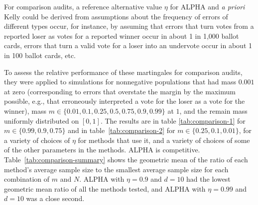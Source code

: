 \documentclass[12pt,runningheads]{llncs}
\begin{document}
{For comparison audits, a reference alternative value $\eta$ for ALPHA and \emph{a priori} Kelly could be derived from assumptions about the 
frequency of errors of different types occur, for instance, by assuming that errors that turn votes from a reported loser 
as votes for a reported winner occur in about 1 in 1,000 ballot cards, errors that turn a valid vote for a loser into an 
undervote occur in about 1 in 100 ballot cards, etc.

To assess the relative performance of these martingales for comparison audits, they were applied to
simulations for nonnegative populations that had mass $0.001$ at zero (corresponding to errors that overstate the
margin by the maximum possible, e.g., that erroneously interpreted a vote for the loser as a vote for the winner), 
mass $m \in \{0.01, 0.1, 0.25, 0.5, 0.75, 0.9, 0.99\}$
at $1$, and the remain mass uniformly distributed on $[0, 1]$.
The results are in table \ref{tab:comparison-1} for $m \in \{0.99, 0.9, 0.75\}$ and 
in table~\ref{tab:comparison-2} for $m \in \{0.25, 0.1, 0.01\}$,
for a variety of choices of $\eta$ for methods that use it, and a variety of choices of some of the other parameters
in the methods.
ALPHA is competitive.
Table~\ref{tab:comparison-summary} shows the geometric mean of the ratio of each method's average sample size
to the smallest average sample size for each combination of $m$ and $N$.
ALPHA with $\eta=0.9$ and $d=10$ had the lowest geometric mean ratio of all the methods tested,
and ALPHA with $\eta=0.99$ and $d=10$ was a close second.

}
\end{document}
